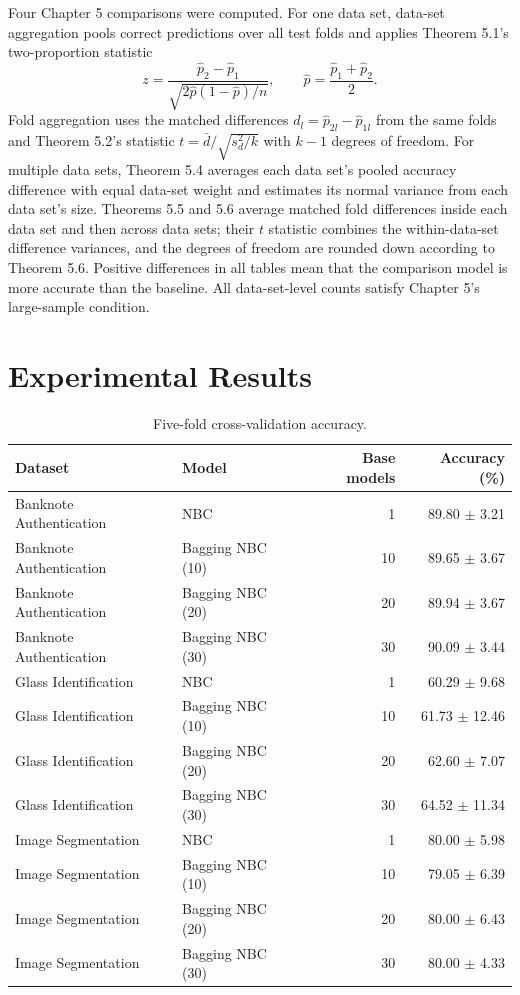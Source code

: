 \documentclass[11pt]{article}
\begin{document}
Four Chapter 5 comparisons were computed. For one data set, data-set aggregation pools correct predictions over all test folds and applies Theorem 5.1's two-proportion statistic
\[
z=\frac{\hat p_2-\hat p_1}{\sqrt{2\hat p(1-\hat p)/n}},
\qquad \hat p=\frac{\hat p_1+\hat p_2}{2}.
\]
Fold aggregation uses the matched differences $d_l=\hat p_{2l}-\hat p_{1l}$ from the same folds and Theorem 5.2's statistic $t=\bar d/\sqrt{s_d^2/k}$ with $k-1$ degrees of freedom. For multiple data sets, Theorem 5.4 averages each data set's pooled accuracy difference with equal data-set weight and estimates its normal variance from each data set's size. Theorems 5.5 and 5.6 average matched fold differences inside each data set and then across data sets; their $t$ statistic combines the within-data-set difference variances, and the degrees of freedom are rounded down according to Theorem 5.6. Positive differences in all tables mean that the comparison model is more accurate than the baseline. All data-set-level counts satisfy Chapter 5's large-sample condition.

\section{Experimental Results}
\begin{table}[H]
\centering
\small
\caption{Five-fold cross-validation accuracy.}
\label{tab:summary}
\begin{tabular}{llrr}
\toprule
Dataset & Model & Base models & Accuracy (\%) \\
\midrule
Banknote Authentication & NBC & 1 & 89.80 $\pm$ 3.21 \\
Banknote Authentication & Bagging NBC (10) & 10 & 89.65 $\pm$ 3.67 \\
Banknote Authentication & Bagging NBC (20) & 20 & 89.94 $\pm$ 3.67 \\
Banknote Authentication & Bagging NBC (30) & 30 & 90.09 $\pm$ 3.44 \\
Glass Identification & NBC & 1 & 60.29 $\pm$ 9.68 \\
Glass Identification & Bagging NBC (10) & 10 & 61.73 $\pm$ 12.46 \\
Glass Identification & Bagging NBC (20) & 20 & 62.60 $\pm$ 7.07 \\
Glass Identification & Bagging NBC (30) & 30 & 64.52 $\pm$ 11.34 \\
Image Segmentation & NBC & 1 & 80.00 $\pm$ 5.98 \\
Image Segmentation & Bagging NBC (10) & 10 & 79.05 $\pm$ 6.39 \\
Image Segmentation & Bagging NBC (20) & 20 & 80.00 $\pm$ 6.43 \\
Image Segmentation & Bagging NBC (30) & 30 & 80.00 $\pm$ 4.33 \\
\bottomrule
\end{tabular}
\end{table}
\end{document}
